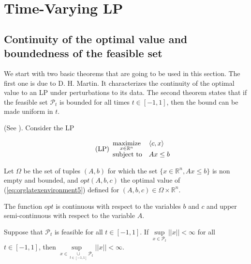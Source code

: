 \documentclass[moor]{informs1}
\begin{document}
\section{Time-Varying LP}
\label{sec:orgheadline10}
\label{orgtarget2}
\subsection{Continuity of the optimal value and boundedness of the feasible set}
\label{sec:orgheadline5}

We start with two basic theorems that are going to be used in this section. The first one is due to D. H. Martin. It characterizes the continuity of the optimal value to an LP under perturbations to its data. The second theorem states that if the feasible set \(\mathcal P_t\) is bounded for all times \(t \in [-1, 1]\), then the bound can be made uniform in \(t\).

\begin{thm}
(See \cite{Martin1975}).
Consider the LP

\begin{equation*}
\label{eq:orglatexenvironment5}
\tag{LP}
\begin{array}{ll@{}ll}
\underset{x \in \mathbb R^n}{\text{maximize}} & \langle c, x \rangle\\
\text{subject to}& A x \le b
\end{array}
\end{equation*}

Let \(\Omega\) be the set of tuples \((A, b)\) for which the set \(\{x \in \mathbb R^n, Ax \le b\}\) is non empty and bounded, and \(opt(A, b, c)\) the optimal value of (\ref{eq:orglatexenvironment5}) defined for \((A, b, c) \in \Omega \times \mathbb R^n\).

The function \(opt\) is continuous with respect to the variables \(b\) and \(c\) and upper semi-continuous with respect to the variable \(A\).
\label{orgspecialblock10}

\end{thm}


\begin{thm}
Suppose that \(\mathcal P_t\) is feasible for all \(t \in [-1, 1]\). If \(\underset{x \in \mathcal P_t}{\sup} ||x|| < \infty\) for all \(t \in [-1, 1]\), then  \(\underset{x \in \underset{t \in [-1, 1]}{\cup} \mathcal P_t}{\sup} ||x|| < \infty\).
\label{orgspecialblock2}

\end{thm}
\end{document}

